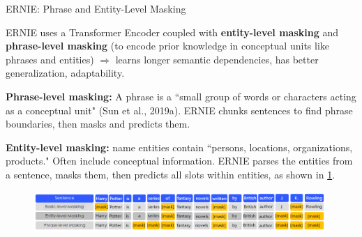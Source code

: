 \begin{frame}{ERNIE: Phrase and Entity-Level Masking}

    \vspace{10pt}
    
    \begin{itemizeSpaced}{5pt}
        \item ERNIE uses a Transformer Encoder coupled with \textbf{entity-level masking} and \textbf{phrase-level masking} (to encode prior knowledge in {\color{DodgerBlue} conceptual units} like phrases and entities) $\Rightarrow$ learns longer semantic dependencies, has better generalization, adaptability. 
        
        \item \textbf{Phrase-level masking: } A phrase is a ``small group of words or characters acting as a {\color{DodgerBlue} conceptual unit}" (Sun et al., 2019a). ERNIE chunks sentences to find phrase boundaries, then masks and predicts them. 
        
        \item \textbf{Entity-level masking: } name entities contain ``persons, locations, organizations, products." Often include conceptual information. ERNIE parses the entities from a sentence, masks them, then predicts all slots within entities, as shown in \cref{fig:ernie_maskingTypes}.
        
    \end{itemizeSpaced}
    
    
    
    \begin{figure}[h]
    \vspace{-5pt}
    \centering
    \includegraphics[width=0.99\textwidth]{imgs/ernie_maskingtypes.png}
    \vspace{-5pt}
    \vspace{-5pt}
    \label{fig:ernie_maskingTypes}
    \end{figure}
    
    
\end{frame}



